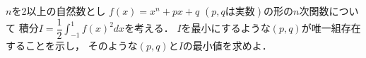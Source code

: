 \documentclass[../../main.tex]{subfiles}
\begin{document}
$n$を2以上の自然数とし
$f(x)=x^n+px+q$ $(p,q\text{は実数})$の形の$n$次関数について
積分$\displaystyle I=\dfrac{1}{2}\int_{-1}^1{f(x)}^2dx$を考える．
$I$を最小にするような$(p,q)$が唯一組存在することを示し，
そのような$(p,q)$と$I$の最小値を求めよ．
\end{document}
